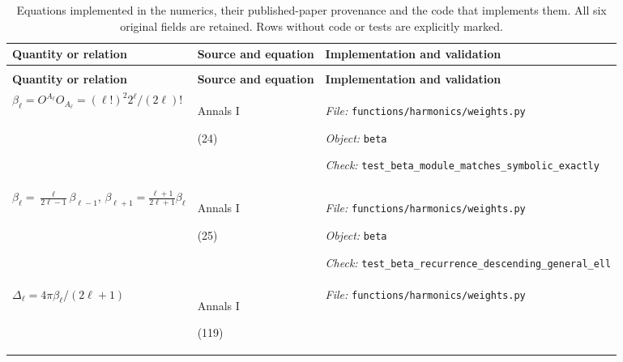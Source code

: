 \begin{landscape}
\begingroup
\footnotesize
\setlength{\tabcolsep}{4pt}
\renewcommand{\arraystretch}{1.18}
\setlength{\LTcapwidth}{\linewidth} %
\begin{longtable}{@{}>{\raggedright\arraybackslash}p{80mm}
                     >{\raggedright\arraybackslash}p{38mm}
                     >{\raggedright\arraybackslash}p{99mm}@{}}
\caption{Equations implemented in the numerics, their published-paper provenance and the code that implements them. All six original fields are retained. Rows without code or tests are explicitly marked.}
\label{tab:equations}\\
\toprule
\textbf{Quantity or relation} & \textbf{Source and equation} & \textbf{Implementation and validation} \\
\midrule
\endfirsthead
\multicolumn{3}{@{}l}{\small\emph{Table \thetable\ (continued)}}\\
\toprule
\textbf{Quantity or relation} & \textbf{Source and equation} & \textbf{Implementation and validation} \\
\midrule
\endhead
\bottomrule
\endfoot
$\beta_\ell = O^{A_\ell}O_{A_\ell} = (\ell!)^2 2^\ell/(2\ell)!$ & Annals I\par (24) & {\scriptsize \textit{File:} \nolinkurl{functions/harmonics/weights.py}\par
\textit{Object:} \nolinkurl{beta}\par
\textit{Check:} \nolinkurl{test_beta_module_matches_symbolic_exactly}} \\
\addlinespace[2pt]
$\beta_\ell = \frac{\ell}{2\ell-1}\beta_{\ell-1}$, $\beta_{\ell+1} = \frac{\ell+1}{2\ell+1}\beta_\ell$ & Annals I\par (25) & {\scriptsize \textit{File:} \nolinkurl{functions/harmonics/weights.py}\par
\textit{Object:} \nolinkurl{beta}\par
\textit{Check:} \nolinkurl{test_beta_recurrence_descending_general_ell}} \\
\addlinespace[2pt]
$\Delta_\ell = 4\pi\beta_\ell/(2\ell+1)$ & Annals I\par (119) & {\scriptsize \textit{File:} \nolinkurl{functions/harmonics/weights.py}\par
}
\end{longtable}
\end{landscape}

